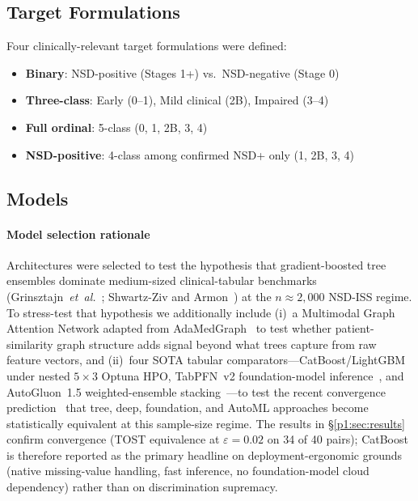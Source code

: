 \subsection{Target Formulations}
Four clinically-relevant target formulations were defined:
\begin{itemize}
    \item \textbf{Binary}: NSD-positive (Stages 1+) vs.\ NSD-negative (Stage 0)
    \item \textbf{Three-class}: Early (0--1), Mild clinical (2B), Impaired (3--4)
    \item \textbf{Full ordinal}: 5-class (0, 1, 2B, 3, 4)
    \item \textbf{NSD-positive}: 4-class among confirmed NSD+ only (1, 2B, 3, 4)
\end{itemize}

\subsection{Models}

\paragraph*{Model selection rationale} Architectures were selected to test the hypothesis that gradient-boosted tree ensembles dominate medium-sized clinical-tabular benchmarks (Grinsztajn~\textit{et~al.}~\cite{grinsztajn2022}; Shwartz-Ziv and Armon~\cite{shwartzziv2022}) at the $n \approx 2{,}000$ NSD-ISS regime. To stress-test that hypothesis we additionally include (i)~a Multimodal Graph Attention Network adapted from AdaMedGraph~\cite{adamedgraph} to test whether patient-similarity graph structure adds signal beyond what trees capture from raw feature vectors, and (ii)~four SOTA tabular comparators---CatBoost/LightGBM under nested $5{\times}3$ Optuna HPO, TabPFN~v2 foundation-model inference~\cite{hollmann2025tabpfn}, and AutoGluon~1.5 weighted-ensemble stacking~\cite{erickson2020autogluon}---to test the recent convergence prediction~\cite{zabergja2024dltabular,ye2024closertabular} that tree, deep, foundation, and AutoML approaches become statistically equivalent at this sample-size regime. The results in \S\ref{p1:sec:results} confirm convergence (TOST equivalence at $\varepsilon{=}0.02$ on 34 of 40 pairs); CatBoost is therefore reported as the primary headline on deployment-ergonomic grounds (native missing-value handling, fast inference, no foundation-model cloud dependency) rather than on discrimination supremacy.

